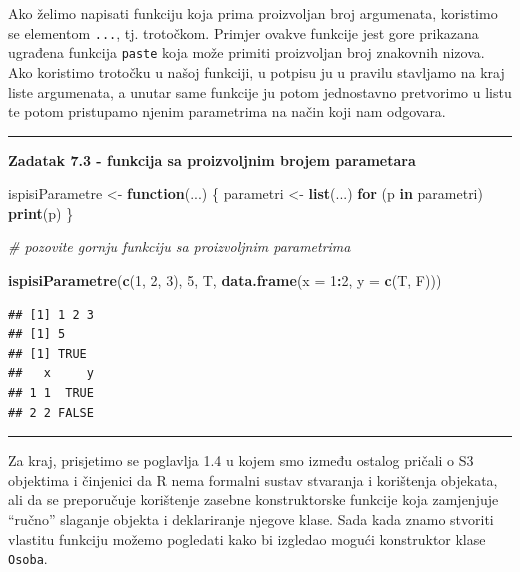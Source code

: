\documentclass[]{book}
\newenvironment{Shaded}{\begin{snugshade}}{\end{snugshade}}
\newcommand{\KeywordTok}[1]{\textcolor[rgb]{0.13,0.29,0.53}{\textbf{#1}}}
\newcommand{\DataTypeTok}[1]{\textcolor[rgb]{0.13,0.29,0.53}{#1}}
\newcommand{\DecValTok}[1]{\textcolor[rgb]{0.00,0.00,0.81}{#1}}
\newcommand{\StringTok}[1]{\textcolor[rgb]{0.31,0.60,0.02}{#1}}
\newcommand{\CommentTok}[1]{\textcolor[rgb]{0.56,0.35,0.01}{\textit{#1}}}
\newcommand{\ControlFlowTok}[1]{\textcolor[rgb]{0.13,0.29,0.53}{\textbf{#1}}}
\newcommand{\OperatorTok}[1]{\textcolor[rgb]{0.81,0.36,0.00}{\textbf{#1}}}
\newcommand{\NormalTok}[1]{#1}
\theoremstyle{definition}
\theoremstyle{definition}
\theoremstyle{definition}
\theoremstyle{remark}
\begin{document}
Ako želimo napisati funkciju koja prima proizvoljan broj argumenata,
koristimo se elementom \texttt{...}, tj. trotočkom. Primjer ovakve
funkcije jest gore prikazana ugrađena funkcija \texttt{paste} koja može
primiti proizvoljan broj znakovnih nizova. Ako koristimo trotočku u
našoj funkciji, u potpisu ju u pravilu stavljamo na kraj liste
argumenata, a unutar same funkcije ju potom jednostavno pretvorimo u
listu te potom pristupamo njenim parametrima na način koji nam odgovara.

\begin{center}\rule{0.5\linewidth}{\linethickness}\end{center}

\textbf{Zadatak 7.3 - funkcija sa proizvoljnim brojem parametara}

\begin{Shaded}
\begin{Highlighting}[]
\NormalTok{ispisiParametre <-}\StringTok{ }\ControlFlowTok{function}\NormalTok{(...) \{}
\NormalTok{   parametri <-}\StringTok{ }\KeywordTok{list}\NormalTok{(...)}
   \ControlFlowTok{for}\NormalTok{ (p }\ControlFlowTok{in}\NormalTok{ parametri) }\KeywordTok{print}\NormalTok{(p)}
\NormalTok{\}}

\CommentTok{# pozovite gornju funkciju sa proizvoljnim parametrima}
\end{Highlighting}
\end{Shaded}

\begin{Shaded}
\begin{Highlighting}[]
\KeywordTok{ispisiParametre}\NormalTok{(}\KeywordTok{c}\NormalTok{(}\DecValTok{1}\NormalTok{, }\DecValTok{2}\NormalTok{, }\DecValTok{3}\NormalTok{), }\DecValTok{5}\NormalTok{, T, }\KeywordTok{data.frame}\NormalTok{(}\DataTypeTok{x =} \DecValTok{1}\OperatorTok{:}\DecValTok{2}\NormalTok{, }\DataTypeTok{y =} \KeywordTok{c}\NormalTok{(T, F)))}
\end{Highlighting}
\end{Shaded}

\begin{verbatim}
## [1] 1 2 3
## [1] 5
## [1] TRUE
##   x     y
## 1 1  TRUE
## 2 2 FALSE
\end{verbatim}

\begin{center}\rule{0.5\linewidth}{\linethickness}\end{center}

Za kraj, prisjetimo se poglavlja 1.4 u kojem smo između ostalog pričali
o S3 objektima i činjenici da R nema formalni sustav stvaranja i
korištenja objekata, ali da se preporučuje korištenje zasebne
konstruktorske funkcije koja zamjenjuje ``ručno'' slaganje objekta i
deklariranje njegove klase. Sada kada znamo stvoriti vlastitu funkciju
možemo pogledati kako bi izgledao mogući konstruktor klase
\texttt{Osoba}.
\end{document}
